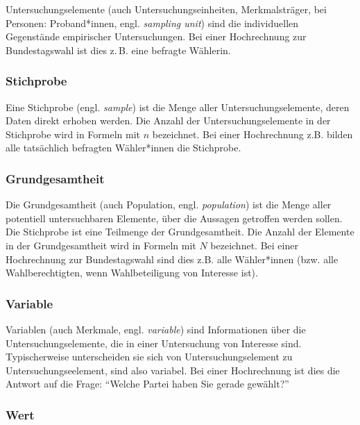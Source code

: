 \documentclass[
  11pt,
  ngerman,
  a4paper,
]{report}
\begin{document}
Untersuchungselemente (auch Untersuchungseinheiten, Merkmalsträger, bei Personen: Proband*innen, engl. \emph{sampling unit}) sind die individuellen Gegenstände empirischer Untersuchungen. Bei einer Hochrechnung zur Bundestagswahl ist dies z.\,B. eine befragte Wählerin.

\hypertarget{stichprobe}{%
\subsubsection{Stichprobe}\label{stichprobe}}

Eine Stichprobe (engl. \emph{sample}) ist die Menge aller Untersuchungselemente, deren Daten direkt erhoben werden. Die Anzahl der Untersuchungselemente in der Stichprobe wird in Formeln mit \(n\) bezeichnet. Bei einer Hochrechnung z.B. bilden alle tatsächlich befragten Wähler*innen die Stichprobe.

\hypertarget{grundgesamtheit}{%
\subsubsection{Grundgesamtheit}\label{grundgesamtheit}}

Die Grundgesamtheit (auch Population, engl. \emph{population}) ist die Menge aller potentiell untersuchbaren Elemente, über die Aussagen getroffen werden sollen. Die Stichprobe ist eine Teilmenge der Grundgesamtheit. Die Anzahl der Elemente in der Grundgesamtheit wird in Formeln mit \(N\) bezeichnet. Bei einer Hochrechnung zur Bundestagswahl sind dies z.B. alle Wähler*innen (bzw. alle Wahlberechtigten, wenn Wahlbeteiligung von Interesse ist).

\hypertarget{variable}{%
\subsubsection{Variable}\label{variable}}

Variablen (auch Merkmale, engl. \emph{variable}) sind Informationen über die Untersuchungselemente, die in einer Untersuchung von Interesse sind. Typischerweise unterscheiden sie sich von Untersuchungselement zu Untersuchungseelement, sind also variabel. Bei einer Hochrechnung ist dies die Antwort auf die Frage: \enquote{Welche Partei haben Sie gerade gewählt?}

\hypertarget{wert}{%
\subsubsection{Wert}\label{wert}}
\end{document}
